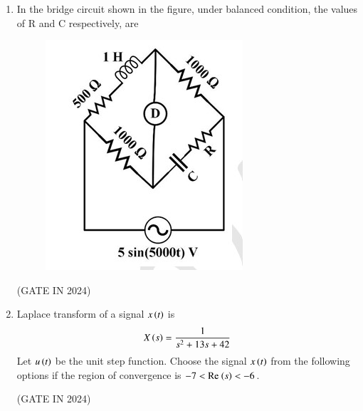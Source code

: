 \documentclass[journal,12pt,onecolumn]{IEEEtran}
\theoremstyle{remark}
\begin{document}
\begin{enumerate}
    \item In the bridge circuit shown in the figure, under balanced condition, the values of R and C respectively, are
    \begin{figure}[H]
        \centering
        \includegraphics[width=0.22\columnwidth]{figs/p18.jpg}
        \caption*{}
        \label{fig:p18}
    \end{figure}
    
    \hfill{(GATE IN 2024)}
    \begin{enumerate}
    \end{enumerate}

    \item Laplace transform of a signal $x\left(t\right)$ is
    \begin{align*}
        X\left(s\right) = \frac{1}{s^2 + 13s + 42}
    \end{align*}
    Let $u\left(t\right)$ be the unit step function. Choose the signal $x\left(t\right)$ from the following options if the region of convergence is $-7 < \text{Re \ensuremath{\left(s\right)}} < -6$.
    
    \hfill{(GATE IN 2024)}
    \begin{enumerate}
    \end{enumerate}


\end{enumerate}
\end{document}
